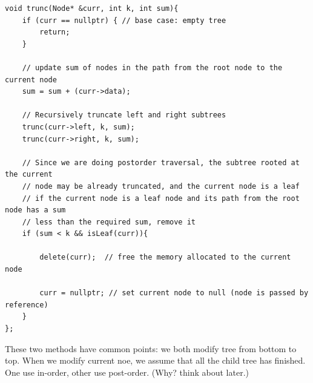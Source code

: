 \documentclass[a4paper,11pt,twoside]{book}
\begin{document}
\begin{lstlisting}
void trunc(Node* &curr, int k, int sum){
	if (curr == nullptr) { // base case: empty tree
		return;
	}
	
	// update sum of nodes in the path from the root node to the current node
	sum = sum + (curr->data);
	
	// Recursively truncate left and right subtrees
	trunc(curr->left, k, sum);
	trunc(curr->right, k, sum);
	
	// Since we are doing postorder traversal, the subtree rooted at the current
	// node may be already truncated, and the current node is a leaf
	// if the current node is a leaf node and its path from the root node has a sum
	// less than the required sum, remove it
	if (sum < k && isLeaf(curr)){
		
		delete(curr);  // free the memory allocated to the current node
		
		curr = nullptr; // set current node to null (node is passed by reference)
	}
};
\end{lstlisting}

	\par These two methods have common points: we both modify tree from bottom to top. When we modify current noe, we assume that all the child tree has finished. One use in-order, other use post-order. (Why? think about later.)



%		
\end{document}
